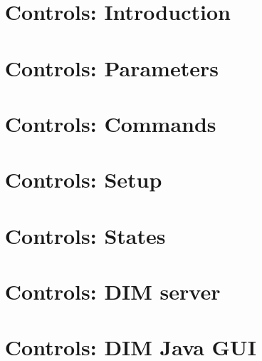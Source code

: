 
\chapter{\dabc~ Controls: Introduction}
 \cleardoublepage
\chapter{\dabc~ Controls: Parameters}
 \cleardoublepage
\chapter{\dabc~ Controls: Commands}
 \cleardoublepage
\chapter{\dabc~ Controls: Setup}
 \cleardoublepage
\chapter{\dabc~ Controls: States}
 \cleardoublepage
\chapter{\dabc~ Controls: DIM server}
 \cleardoublepage
\chapter{\dabc~ Controls: DIM Java GUI}
 \cleardoublepage

